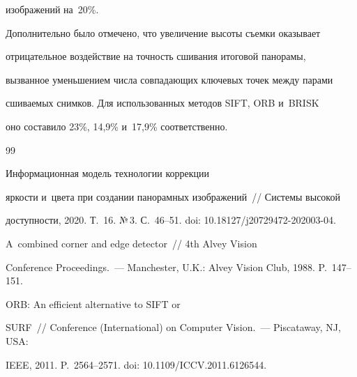 изображений на~20\%.


  


  Дополнительно было отмечено, что увеличение высоты съемки оказывает 


отрицательное воздействие на точ\-ность сшивания итоговой панорамы, 


вызванное уменьшением чис\-ла совпадающих ключевых точек между парами 


сши\-ва\-емых снимков. Для использованных методов SIFT, ORB и~BRISK 


оно со\-ста\-ви\-ло 23\%, 14,9\% и~17,9\% соответственно.


  


{\small\frenchspacing


{%




\begin{thebibliography}{99}




   Информационная модель технологии коррекции 


яр\-кости и~цвета при создании па\-но\-рам\-ных изображений~/\!\!/ Системы высокой 


до\-ступ\-ности, 2020. Т.~16. №\,3. С.~46--51. doi: 10.18127\!/\!j20729472-202003-04.







   A~combined corner and edge detector~/\!\!/ 4th Alvey Vision 


Conference Proceedings.~--- Manchester, U.K.: Alvey Vision Club, 1988. P.~147--151.







   ORB: An efficient alternative to SIFT or 


SURF~/\!\!/  Conference (International) on Computer Vision.~--- Piscataway, NJ, USA: 


IEEE, 2011. P.~2564--2571. doi: 10.1109\!/\!ICCV.2011.6126544.








\end{thebibliography}}}
